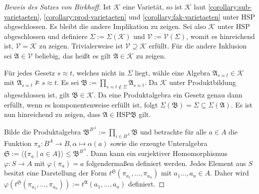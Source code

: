 \begin{proof}[Beweis des Satzes von Birkhoff]
    Ist $\mathcal{K}$ eine Varietät, so ist $\mathcal{K}$ laut \ref{corollary:sub-varietaeten}, \ref{corollary:prod-varietaeten} und
    \ref{corollary:fak-varietaeten} unter $\mathrm{HSP}$ abgeschlossen.
    Es bleibt die andere Implikation zu zeigen. Sei also $\mathcal{K}$ unter $\mathrm{HSP}$ abgeschlossen und definiere $\Sigma:=\Sigma(\mathcal{K})$ und $\mathcal{V}:=\mathcal{V}(\Sigma)$,
    womit es hinreichend ist, $\mathcal{V}=\mathcal{K}$ zu zeigen. Trivialerweise ist $\mathcal{V}\supseteq\mathcal{K}$ erfüllt. Für die andere
    Inklusion sei $\mathfrak{A}\in\mathcal{V}$ beliebig, das heißt es gilt $\mathfrak{A}\in\mathcal{K}$ zu zeigen.

    Für jedes Gesetz $s\approx t$, welches nicht in $\Sigma$ liegt, wähle eine Algebra $\mathfrak{A}_{s\approx t}\in\mathcal{K}$ mit
    $\mathfrak{A}_{s\approx t}\not\models s\approx t$.
    Es sei $\mathfrak{B}:=\prod_{s\approx t\not\in\Sigma}\mathfrak{A}_{s\approx t}$. Da $\mathcal{K}$ unter Produktbildung abgeschlossen ist,
    gilt $\mathfrak{B}\in\mathcal{K}$. Da eine Produktalgebra ein Gesetz genau dann erfüllt, wenn es komponentenweise erfüllt ist,
    folgt $\Sigma(\mathfrak{B})=\Sigma\subseteq\Sigma(\mathfrak{A})$. Es ist nun hinreichend zu zeigen, dass $\mathfrak{A} \in \mathrm{HSP}\mathfrak{B}$ gilt.

    Bilde die Produktalgebra $\mathfrak{B}^{B^A}:=\prod_{i\in B^A}\mathfrak{B}$ und betrachte für alle $a\in A$
    die Funktion $\pi_a:B^A\to B, \alpha\mapsto \alpha(a)$ sowie die erzeugte Unteralgebra $\mathfrak{S}:=\langle\{\pi_a\mid a\in A\}\rangle\le \mathfrak{B}^{B^A}$.
    Dann kann ein surjektiver Homomorphismus $\varphi:S\to A$ mit $\varphi(\pi_a)=a$ folgendermaßen definiert werden.
    Jedes Element aus $S$ besitzt eine Darstellung der Form $t^\mathfrak{S}(\pi_{a_1},\ldots,\pi_{a_n})$ mit $a_1\ldots,a_n\in A$.
    Daher wird $\varphi(t^\mathfrak{S}(\pi_{a_1},\ldots,\pi_{a_n})):=t^\mathfrak{A}(a_1,\ldots,a_n)$ definiert. 


\end{proof}
